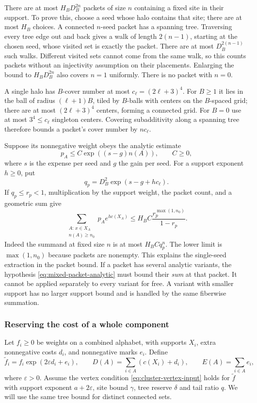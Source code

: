 There are at most $H_BD_B^{2n}$ packets of size $n$ containing a fixed
site in their support. To prove this, choose a seed whose halo contains
that site; there are at most $H_B$ choices. A connected $n$-seed packet
has a spanning tree. Traversing every tree edge out and back gives a
walk of length $2(n-1)$, starting at the chosen seed, whose visited
set is exactly the packet. There are at most $D_B^{2(n-1)}$ such walks.
Different visited sets cannot come from the same walk, so this counts
packets without an injectivity assumption on their placements.
Enlarging the bound to $H_BD_B^{2n}$ also covers $n=1$ uniformly. There
is no packet with $n=0$.

A single halo has $B$-cover number at most
$c_\ell=(2\ell+3)^4$. For $B\ge1$ it lies in the ball of radius
$(\ell+1)B$, tiled by $B$-balls with centers on the $B$-spaced grid;
there are at most $(2\ell+3)^4$ centers, forming a connected grid.
For $B=0$ use at most $3^4\le c_\ell$ singleton centers. Covering
subadditivity along a spanning tree therefore bounds a packet's
cover number by $nc_\ell$.

Suppose its nonnegative weight obeys the analytic estimate
\begin{equation}\label{eq:mixed-packet-analytic}
                  p_A\le C\exp((s-g)n(A)),\qquad C\ge0,
\end{equation}
where $s$ is the expense per seed and $g$ the gain per seed. For a
support exponent $h\ge0$, put
\[
                   q_p=D_B^2\exp(s-g+hc_\ell).
\]
If $q_p\le r_p<1$, multiplication by the support weight, the packet
count, and a geometric sum give
\begin{equation}\label{eq:mixed-packet-hit}
 \sum_{\substack{A:\,x\in X_A\\n(A)\ge n_0}}
                  p_Ae^{h c(X_A)}
          \le H_BC\frac{r_p^{\max(1,n_0)}}{1-r_p}.
\end{equation}
Indeed the summand at fixed size $n$ is at most $H_BCq_p^n$.
The lower limit is $\max(1,n_0)$ because packets are nonempty.
This explains the single-seed extraction in the packet bound.
If a packet has several analytic variants, the hypothesis
\eqref{eq:mixed-packet-analytic} must bound their \emph{sum} at that
packet. It cannot be applied separately to every variant for free.
A variant with smaller support has no larger support bound and is
handled by the same fiberwise summation.

\subsubsection{Reserving the cost of a whole component}
Let $f_i\ge0$ be weights on a combined alphabet, with supports $X_i$,
extra nonnegative costs $d_i$, and nonnegative marks $e_i$. Define
\[
 \widetilde f_i=f_i\exp(2\varepsilon d_i+e_i),\qquad
 D(A)=\sum_{i\in A}(c(X_i)+d_i),\qquad E(A)=\sum_{i\in A}e_i,
\]
where $\varepsilon>0$. Assume the vertex condition
\eqref{eq:cluster-vertex-input} holds for $\widetilde f$ with support
exponent $a+2\varepsilon$, site bound $\gamma$, tree reserve $\delta$
and tail ratio $q$. We will use the same tree bound for distinct
connected sets.

